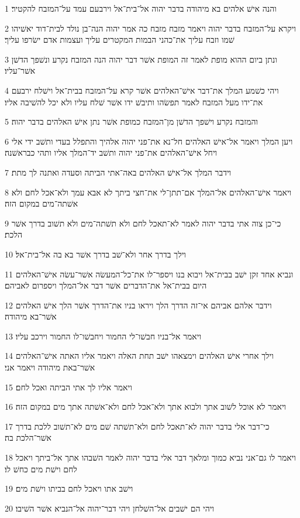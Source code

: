 \par 1 והנה אישׁ אלהים בא מיהודה בדבר יהוה אל־בית־אל וירבעם עמד על־המזבח להקטיר׃
\par 2 ויקרא על־המזבח בדבר יהוה ויאמר מזבח מזבח כה אמר יהוה הנה־בן נולד לבית־דוד יאשׁיהו שׁמו וזבח עליך את־כהני הבמות המקטרים עליך ועצמות אדם ישׂרפו עליך׃
\par 3 ונתן ביום ההוא מופת לאמר זה המופת אשׁר דבר יהוה הנה המזבח נקרע ונשׁפך הדשׁן אשׁר־עליו׃
\par 4 ויהי כשׁמע המלך את־דבר אישׁ־האלהים אשׁר קרא על־המזבח בבית־אל וישׁלח ירבעם את־ידו מעל המזבח לאמר תפשׂהו ותיבשׁ ידו אשׁר שׁלח עליו ולא יכל להשׁיבה אליו׃
\par 5 והמזבח נקרע וישׁפך הדשׁן מן־המזבח כמופת אשׁר נתן אישׁ האלהים בדבר יהוה׃
\par 6 ויען המלך ויאמר אל־אישׁ האלהים חל־נא את־פני יהוה אלהיך והתפלל בעדי ותשׁב ידי אלי ויחל אישׁ־האלהים את־פני יהוה ותשׁב יד־המלך אליו ותהי כבראשׁנה׃
\par 7 וידבר המלך אל־אישׁ האלהים באה־אתי הביתה וסעדה ואתנה לך מתת׃
\par 8 ויאמר אישׁ־האלהים אל־המלך אם־תתן־לי את־חצי ביתך לא אבא עמך ולא־אכל לחם ולא אשׁתה־מים במקום הזה׃
\par 9 כי־כן צוה אתי בדבר יהוה לאמר לא־תאכל לחם ולא תשׁתה־מים ולא תשׁוב בדרך אשׁר הלכת׃
\par 10 וילך בדרך אחר ולא־שׁב בדרך אשׁר בא בה אל־בית־אל׃
\par 11 ונביא אחד זקן ישׁב בבית־אל ויבוא בנו ויספר־לו את־כל־המעשׂה אשׁר־עשׂה אישׁ־האלהים היום בבית־אל את־הדברים אשׁר דבר אל־המלך ויספרום לאביהם׃
\par 12 וידבר אלהם אביהם אי־זה הדרך הלך ויראו בניו את־הדרך אשׁר הלך אישׁ האלהים אשׁר־בא מיהודה׃
\par 13 ויאמר אל־בניו חבשׁו־לי החמור ויחבשׁו־לו החמור וירכב עליו׃
\par 14 וילך אחרי אישׁ האלהים וימצאהו ישׁב תחת האלה ויאמר אליו האתה אישׁ־האלהים אשׁר־באת מיהודה ויאמר אני׃
\par 15 ויאמר אליו לך אתי הביתה ואכל לחם׃
\par 16 ויאמר לא אוכל לשׁוב אתך ולבוא אתך ולא־אכל לחם ולא־אשׁתה אתך מים במקום הזה׃
\par 17 כי־דבר אלי בדבר יהוה לא־תאכל לחם ולא־תשׁתה שׁם מים לא־תשׁוב ללכת בדרך אשׁר־הלכת בה׃
\par 18 ויאמר לו גם־אני נביא כמוך ומלאך דבר אלי בדבר יהוה לאמר השׁבהו אתך אל־ביתך ויאכל לחם וישׁת מים כחשׁ לו׃
\par 19 וישׁב אתו ויאכל לחם בביתו וישׁת מים׃
\par 20 ויהי הם ישׁבים אל־השׁלחן ויהי דבר־יהוה אל־הנביא אשׁר השׁיבו׃
